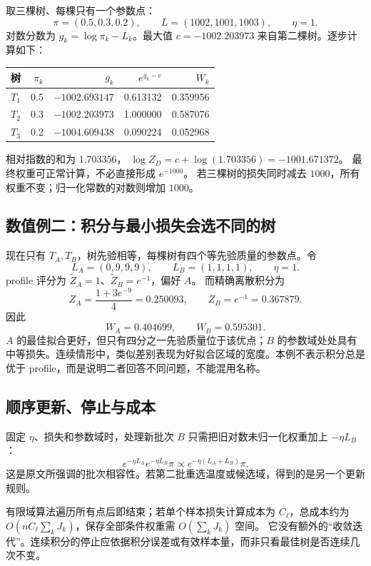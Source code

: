 \documentclass[UTF8,11pt,fontset=fandol,openany,oneside]{ctexbook}
\theoremstyle{definition}
\theoremstyle{remark}
\numberwithin{equation}{chapter}
\begin{document}
取三棵树、每棵只有一个参数点：
\[
 \pi=(0.5,0.3,0.2),\qquad L=(1002,1001,1003),\qquad\eta=1.
\]
对数分数为 $g_k=\log\pi_k-L_k$。最大值
$c=-1002.203973$ 来自第二棵树。逐步计算如下：
\begin{center}
\begin{tabular}{lrrrr}
\toprule
树 & $\pi_k$ & $g_k$ & $e^{g_k-c}$ & $W_k$\\
\midrule
$T_1$ & 0.5 & $-1002.693147$ & 0.613132 & 0.359956\\
$T_2$ & 0.3 & $-1002.203973$ & 1.000000 & 0.587076\\
$T_3$ & 0.2 & $-1004.609438$ & 0.090224 & 0.052968\\
\bottomrule
\end{tabular}
\end{center}
相对指数的和为 $1.703356$，
$\log Z_D=c+\log(1.703356)=-1001.671372$。
最终权重可正常计算，不必直接形成 $e^{-1000}$。
若三棵树的损失同时减去 $1000$，所有权重不变；归一化常数的对数则增加 $1000$。

\subsection{数值例二：积分与最小损失会选不同的树}

现在只有 $T_A,T_B$，树先验相等，每棵树有四个等先验质量的参数点。令
\[
 L_A=(0,9,9,9),\qquad L_B=(1,1,1,1),\qquad\eta=1.
\]
profile 评分为 $\widetilde Z_A=1$、$\widetilde Z_B=e^{-1}$，偏好 $A$。
而精确离散积分为
\[
 Z_A=\frac{1+3e^{-9}}4=0.250093,\qquad
 Z_B=e^{-1}=0.367879.
\]
因此
\[
 W_A=0.404699,\qquad W_B=0.595301.
\]
$A$ 的最佳拟合更好，但只有四分之一先验质量位于该优点；$B$ 的参数域处处具有中等损失。连续情形中，类似差别表现为好拟合区域的宽度。本例不表示积分总是优于 profile，而是说明二者回答不同问题，不能混用名称。

\subsection{顺序更新、停止与成本}

固定 $\eta$、损失和参数域时，处理新批次 $B$ 只需把旧对数未归一化权重加上 $-\eta L_B$：
\[
 e^{-\eta L_A}e^{-\eta L_B}\pi
 \propto e^{-\eta(L_A+L_B)}\pi.
\]
这是原文所强调的批次相容性。若第二批重选温度或候选域，得到的是另一个更新规则。

有限域算法遍历所有点后即结束；若单个样本损失计算成本为 $C_\ell$，总成本约为
$O(nC_\ell\sum_kJ_k)$，保存全部条件权重需 $O(\sum_kJ_k)$ 空间。
它没有额外的“收敛迭代”。连续积分的停止应依据积分误差或有效样本量，而非只看最佳树是否连续几次不变。
\end{document}
